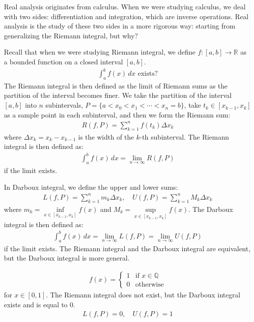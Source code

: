 Real analysis originates from calculus. When we were studying calculus, we deal with two sides:
differentiation and integration, which are inverse operations.
Real analysis is the study of these two sides in a more rigorous way: starting from generalizing the 
Riemann integral, but why?

Recall that when we were studying Riemann integral, we define 
$f: [a, b] \to \mathbb{R}$ as a bounded function on a closed interval $[a, b]$.
\begin{gather}
\int_a^b f(x) \, dx \text{ exists?}
\end{gather}
The Riemann integral is then defined as the limit of Riemann sums as the partition of the interval becomes finer.
We take the partition of the interval $[a, b]$ into $n$ subintervals,
$P = \{ a < x_0 < x_1 < \cdots < x_n = b \}$,
take $t_k \in [x_{k-1}, x_k]$ as a sample point in each subinterval,
and then we form the Riemann sum:
\begin{gather}
R(f, P) = \sum_{k=1}^n f(t_k) \Delta x_k
\end{gather}
where $\Delta x_k = x_k - x_{k-1}$ is the width of the $k$-th subinterval.
The Riemann integral is then defined as:
\begin{gather}
\int_a^b f(x) \, dx = \lim_{n \to \infty} R(f, P)
\end{gather}
if the limit exists.

In Darboux integral, we define the upper and lower sums:
\begin{gather}
L(f, P) = \sum_{k=1}^n m_k \Delta x_k, \quad U(f, P) = \sum_{k=1}^n M_k \Delta x_k
\end{gather}
where $m_k = \inf\limits_{x \in [x_{k-1}, x_k]} f(x)$ and $M_k = \sup\limits_{x \in [x_{k-1}, x_k]} f(x)$.
The Darboux integral is then defined as:
\begin{gather}
\int_a^b f(x) \, dx = \lim_{n \to \infty} L(f, P) = \lim_{n \to \infty} U(f, P)
\end{gather}
if the limit exists.
The Riemann integral and the Darboux integral are equivalent, but the Darboux integral is more general.

\begin{eg}
    \label{eg1}
    \begin{gather*}
        f(x) = \begin{cases}
            1 & \text{if } x \in \mathbb{Q} \\
            0 & \text{otherwise}
        \end{cases}
    \end{gather*}
    for $x \in [0,1].$
    The Riemann integral does not exist, but the Darboux integral exists and is equal to 0.
    \begin{gather*}
        L(f, P) = 0, \quad U(f, P) = 1
    \end{gather*}
\end{eg}

